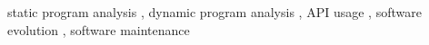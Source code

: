 \documentclass[3p,times]{elsarticle}
\begin{document}
\begin{frontmatter}
\begin{keyword}
static program analysis \sep
dynamic program analysis \sep
API usage \sep
software evolution \sep
software maintenance


\end{keyword}

\end{frontmatter}







%









\end{document}

